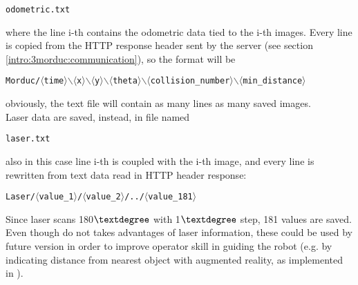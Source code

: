 \begin{center}
  \texttt{odometric.txt}
\end{center}

where the line i-th contains the odometric data tied to the i-th
images. Every line is copied from the HTTP response header sent
by the \morduc{} server (see section \ref{intro:3morduc:communication}),
so the format will be

\begin{center}
  \texttt{Morduc/$\langle$time$\rangle$$\backslash$$\langle$x$\rangle$$\backslash$$\langle$y$\rangle$$\backslash$$\langle$theta$\rangle$$\backslash$$\langle$collision\_number$\rangle$$\backslash$$\langle$min\_distance$\rangle$}
\end{center}

obviously, the text file will contain as many lines as many
saved images.
\\
Laser data are saved, instead, in file named

\begin{center}
  \texttt{laser.txt}
\end{center}

also in this case line i-th is coupled with the i-th image, and
every line is rewritten from text data read in HTTP header
response:

\begin{center}
  \texttt{Laser/$\langle$value\_1$\rangle$/$\langle$value\_2$\rangle$/../$\langle$value\_181$\rangle$}
\end{center}

Since laser scans 180$\textdegree$ with 1$\textdegree$ step,
181 values are saved.
\\
Even though \framework{} do not takes
advantages of laser information, these could be used by future
version in order to improve operator skill in guiding the robot
(e.g. by indicating distance from nearest object with augmented
reality, as implemented in \cite{morduc:macalusodetommaso}).
